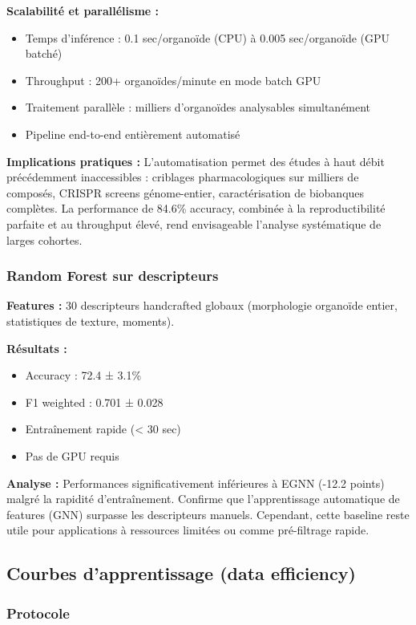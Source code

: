 \textbf{Scalabilité et parallélisme :}
\begin{itemize}
    \item Temps d'inférence : 0.1 sec/organoïde (CPU) à 0.005 sec/organoïde (GPU batché)
    \item Throughput : 200+ organoïdes/minute en mode batch GPU
    \item Traitement parallèle : milliers d'organoïdes analysables simultanément
    \item Pipeline end-to-end entièrement automatisé
\end{itemize}

\textbf{Implications pratiques :}
L'automatisation permet des études à haut débit précédemment inaccessibles : criblages pharmacologiques sur milliers de composés, CRISPR screens génome-entier, caractérisation de biobanques complètes. La performance de 84.6\% accuracy, combinée à la reproductibilité parfaite et au throughput élevé, rend envisageable l'analyse systématique de larges cohortes.

\subsubsection{Random Forest sur descripteurs}

\textbf{Features :}
30 descripteurs handcrafted globaux (morphologie organoïde entier, statistiques de texture, moments).

\textbf{Résultats :}
\begin{itemize}
    \item Accuracy : 72.4 ± 3.1\%
    \item F1 weighted : 0.701 ± 0.028
    \item Entraînement rapide (< 30 sec)
    \item Pas de GPU requis
\end{itemize}

\textbf{Analyse :}
Performances significativement inférieures à EGNN (-12.2 points) malgré la rapidité d'entraînement. Confirme que l'apprentissage automatique de features (GNN) surpasse les descripteurs manuels. Cependant, cette baseline reste utile pour applications à ressources limitées ou comme pré-filtrage rapide.

\subsection{Courbes d'apprentissage (data efficiency)}

\subsubsection{Protocole}

